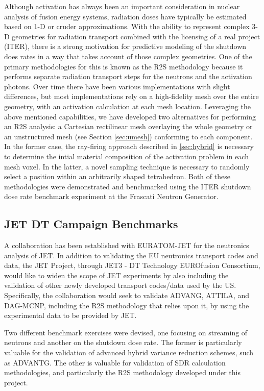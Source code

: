 Although activation has always been an important consideration in nuclear
analysis of fusion energy systems, radiation doses have typically be estimated
based on 1-D or cruder approximations.  With the ability to represent complex
3-D geometries for radiation transport combined with the licensing of a real
project (ITER), there is a strong motivation for predictive modeling of the
shutdown does rates in a way that takes account of those complex geometries.
One of the primary methodologies for this is known as the \gls{R2S}
methodology because it performs separate radiation transport steps for the
neutrons and the activation photons.  Over time there have been various
implementations with slight differences, but most implementations rely on a
high-fidelity mesh over the entire geometry, with an activation calculation at
each mesh location.  Leveraging the above mentioned capabilities, we have
developed two alternatives for performing an \gls{R2S} analysis: a Cartesian
rectilinear mesh overlaying the whole geometry or an unstructured mesh (see
Section \ref{sec:umesh}) conforming to each component.  In the former case,
the ray-firing approach described in \ref{sec:hybrid} is necessary to
determine the intial material composition of the activation problem in each
mesh voxel.  In the latter, a novel sampling technique is necessary to
randomly select a position within an arbitrarily shaped
tetrahedron. Both of these methodologies were
demonstrated and benchmarked using the ITER shutdown dose rate benchmark
experiment at the Frascati Neutron Generator.

\subsection{JET DT Campaign Benchmarks}

A collaboration has been established with EURATOM-JET for the neutronics
analysis of JET.  In addition to validating the EU neutronics transport codes
and data, the JET Project, through JET3 - DT Technology EUROfusion Consortium,
would like to widen the scope of JET experiments by also including the
validation of other newly developed transport codes/data used by the US.
Specifically, the collaboration would seek to validate ADVANG, ATTILA, and
DAG-MCNP, including the \gls{R2S} methodology that relies upon it, by using
the experimental data to be provided by JET.

Two different benchmark exercises were devised, one focusing on streaming of
neutrons and another on the shutdown dose rate.  The former is particularly
valuable for the validation of advanced hybrid variance reduction schemes,
such as ADVANTG.  The other is valuable for validation of \gls{SDR}
calculation methodologies, and particularly the \gls{R2S} methodology
developed under this project.

